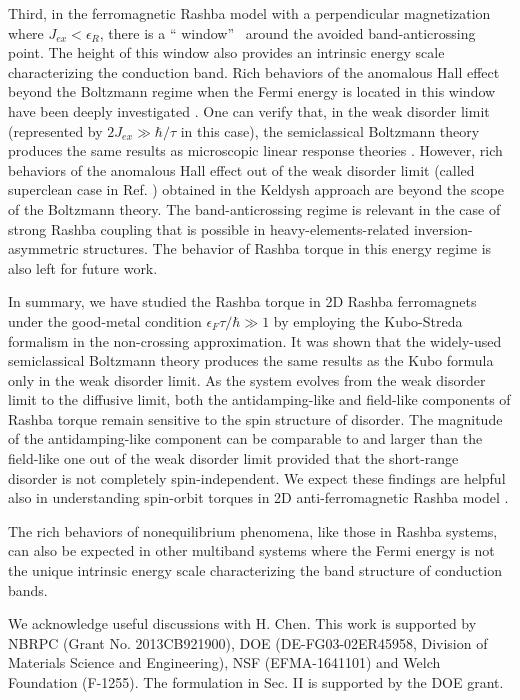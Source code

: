 \documentclass
[aps,pra,amsfonts,amssymb,twocolumn,amsmath,preprintnumbers,nofootinbib,floatfix,
showpacs,superscriptaddress]{revtex4-1}%
\begin{document}
Third, in the ferromagnetic Rashba model with a perpendicular magnetization
where $J_{ex}<\epsilon_{R}$, there is a \textquotedblleft
window\textquotedblright\ \cite{Onoda} around the avoided band-anticrossing
point. The height of this window also provides an intrinsic energy scale
characterizing the conduction band. Rich behaviors of the anomalous Hall
effect beyond the Boltzmann regime when the Fermi energy is located in this
window have been deeply investigated \cite{Onoda}. One can verify that, in the
weak disorder limit (represented by $2J_{ex}\gg\hbar/\tau$ in this case), the
semiclassical Boltzmann theory \cite{Sinitsyn2008} produces the same results
as microscopic linear response theories \cite{Onoda,Nunner2007}. However, rich
behaviors of the anomalous Hall effect out of the weak disorder limit (called
superclean case in Ref. ) obtained in the Keldysh approach
are beyond the scope of the Boltzmann theory. The band-anticrossing regime is
relevant in the case of strong Rashba coupling that is possible in
heavy-elements-related inversion-asymmetric structures. The behavior of Rashba
torque in this energy regime is also left for future work.

In summary, we have studied the Rashba torque in 2D Rashba ferromagnets under
the good-metal condition $\epsilon_{F}\tau/\hbar\gg1$ by employing the
Kubo-Streda formalism in the non-crossing approximation. It was shown that the
widely-used semiclassical Boltzmann theory produces the same results as the
Kubo formula only in the weak disorder limit. As the system evolves from the
weak disorder limit to the diffusive limit, both the antidamping-like and
field-like components of Rashba torque remain sensitive to the spin structure
of disorder. The magnitude of the antidamping-like component can be comparable to
and larger than the field-like one out of the weak disorder limit provided
that the short-range disorder is not completely spin-independent. We expect
these findings are helpful also in understanding spin-orbit torques in 2D
anti-ferromagnetic Rashba model \cite{Zelezny2017}.

The rich behaviors of nonequilibrium phenomena, like those in Rashba systems,
can also be expected in other multiband systems where the Fermi energy is not
the unique intrinsic energy scale characterizing the band structure of
conduction bands.

\begin{acknowledgments}
We acknowledge useful discussions with H. Chen. This work is supported by NBRPC (Grant No. 2013CB921900), DOE (DE-FG03-02ER45958, Division of Materials Science and Engineering), NSF (EFMA-1641101) and Welch Foundation (F-1255).
The formulation in Sec. II is supported by the DOE grant.
\end{acknowledgments}
\end{document}
